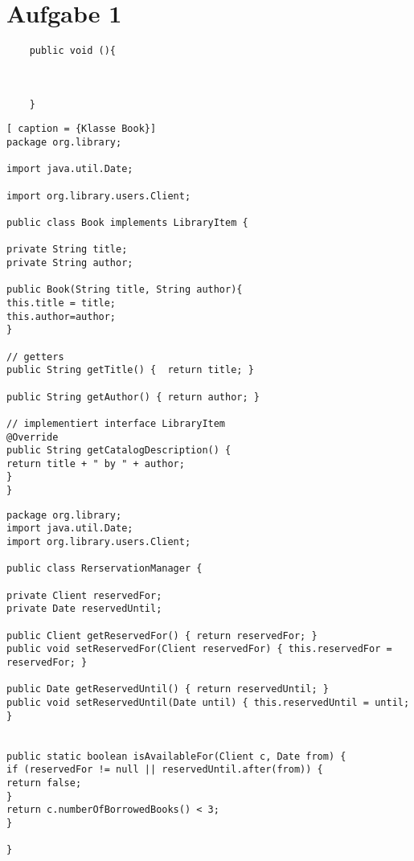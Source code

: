 \chapter{Aufgabe 1}

\lstset{language=Java,
	showspaces=false,
	showtabs=false,
	breaklines=true,
	showstringspaces=false,
	breakatwhitespace=true,
}





\begin{lstlisting}
	public void (){
	
	
	
	}
\end{lstlisting}




\begin{lstlisting}[	caption = {Klasse Book}]
package org.library;

import java.util.Date;

import org.library.users.Client;

public class Book implements LibraryItem {

private String title;
private String author;

public Book(String title, String author){
this.title = title;
this.author=author;
}

// getters
public String getTitle() {  return title; }

public String getAuthor() { return author; }

// implementiert interface LibraryItem
@Override
public String getCatalogDescription() {
return title + " by " + author;  
}
}
\end{lstlisting}


\begin{lstlisting}[caption = {RerservationManager}]
package org.library;
import java.util.Date;
import org.library.users.Client;

public class RerservationManager {

private Client reservedFor;
private Date reservedUntil;   	

public Client getReservedFor() { return reservedFor; }
public void setReservedFor(Client reservedFor) { this.reservedFor = reservedFor; }

public Date getReservedUntil() { return reservedUntil; }
public void setReservedUntil(Date until) { this.reservedUntil = until; }


public static boolean isAvailableFor(Client c, Date from) {
if (reservedFor != null || reservedUntil.after(from)) {
return false;
}
return c.numberOfBorrowedBooks() < 3;
}

}
\end{lstlisting}